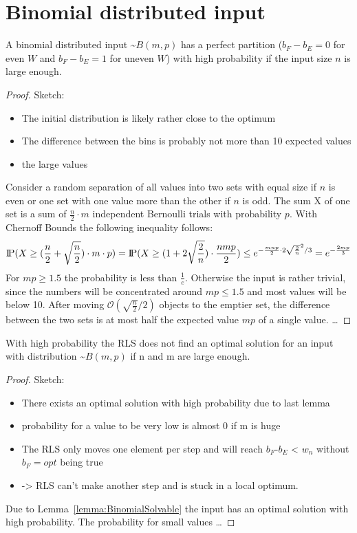 \section{Binomial distributed input}
\begin{lemma}\label{lemma:BinomialSolvable}
    A binomial distributed input \textasciitilde$B(m,p)$ has a perfect partition ($b_F - b_E = 0$ for even $W$ and $b_F - b_E = 1$ for uneven $W$) with high probability if the input size $n$ is large enough.
\end{lemma}
\begin{proof}
    Sketch:
    \begin{itemize}
        \item The initial distribution is likely rather close to the optimum
        \item The difference between the bins is probably not more than 10 expected values
        \item the large values
    \end{itemize}
    Consider a random separation of all values into two sets with equal size if $n$ is even or one set with one value more than the other if $n$ is odd. The sum X of one set is a sum of $\frac{n}{2}\cdot m$ independent Bernoulli trials with probability $p$. With Chernoff Bounds the following inequality follows:
    \[\text{I\kern-0.15em P}(X\ge(\frac{n}{2}+\sqrt{\frac{n}{2}})\cdot m \cdot p) = \text{I\kern-0.15em P}(X\ge(1+2\sqrt{\frac{2}{n}})\cdot \frac{nmp}{2}) \le e^{-\frac{mnp}{2}\cdot2\sqrt{\frac{2}{n}}^2 /3} = e^{-\frac{2mp}{3}}\]
    For $mp\ge1.5$ the probability is less than $\frac{1}{e}$. Otherwise the input is rather trivial, since the numbers will be concentrated around $mp\le1.5$ and most values will be below 10.\newline
    After moving $\mathcal{O}(\sqrt{\frac{n}{2}}/2)$ objects to the emptier set, the difference between the two sets is at most half the expected value $mp$ of a single value.
    \dots
\end{proof}


\begin{lemma}
    With high probability the RLS does not find an optimal solution for an input with distribution \textasciitilde$B(m,p)$ if n and m are large enough.
\end{lemma}
\begin{proof}
    Sketch:
    \begin{itemize}
        \item There exists an optimal solution with high probability due to last lemma
        \item probability for a value to be very low is almost 0 if m is huge
        \item The RLS only moves one element per step and will reach $b_F$-$b_E$ < $w_n$ without $b_F= opt$ being true
        \item -> RLS can't make another step and is stuck in a local optimum.
    \end{itemize}
    Due to Lemma~\ref{lemma:BinomialSolvable} the input has an optimal solution with high probability. The probability for small values \dots
\end{proof}